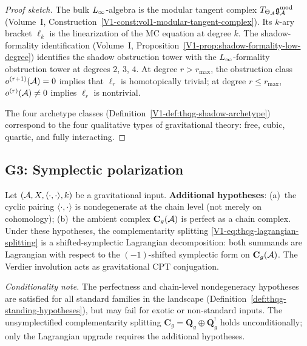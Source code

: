 \begin{proof}[Proof sketch]
The bulk $L_\infty$-algebra is the modular tangent complex
$T_{\Theta_{\mathcal{A}}}\mathfrak{g}_{\mathcal{A}}^{\mathrm{mod}}$ (Volume~I,
Construction~\ref{V1-const:vol1-modular-tangent-complex}). Its
$k$-ary bracket $\ell_k$ is the linearization of the MC equation
at degree $k$. The shadow-formality identification
(Volume~I, Proposition~\ref{V1-prop:shadow-formality-low-degree})
identifies the shadow obstruction tower with the $L_\infty$-formality obstruction
tower at degrees $2$, $3$, $4$. At degree $r > r_{\max}$, the
obstruction class $o^{(r+1)}(\mathcal{A}) = 0$ implies that $\ell_r$ is
homotopically trivial; at degree $r \le r_{\max}$, $o^{(r)}(\mathcal{A}) \ne 0$
implies $\ell_r$ is nontrivial.

The four archetype classes (Definition~\ref{V1-def:thqg-shadow-archetype})
correspond to the four qualitative types of gravitational theory: free,
cubic, quartic, and fully interacting.
\end{proof}


\subsection{G3: Symplectic polarization}

\begin{theorem}
Let $(\mathcal{A}, X, \langle\cdot,\cdot\rangle, k)$ be a gravitational input.
\textbf{Additional hypotheses}: (a)~the cyclic pairing
$\langle\cdot,\cdot\rangle$ is nondegenerate at the chain level
(not merely on cohomology); (b)~the ambient complex $\mathbf{C}_g(\mathcal{A})$
is perfect as a chain complex.
Under these hypotheses, the complementarity splitting
\eqref{V1-eq:thqg-lagrangian-splitting} is a shifted-symplectic Lagrangian
decomposition: both summands are Lagrangian with respect to the
$(-1)$-shifted symplectic form on $\mathbf{C}_g(\mathcal{A})$. The Verdier
involution acts as gravitational CPT conjugation.

\smallskip\noindent
\textit{Conditionality note.}
The perfectness and chain-level nondegeneracy hypotheses are satisfied
for all standard families in the landscape
(Definition~\ref{def:thqg-standing-hypotheses}), but may fail for
exotic or non-standard inputs. The unsymplectified complementarity
splitting $\mathbf{C}_g = \mathbf{Q}_g \oplus \mathbf{Q}_g^!$ holds
unconditionally; only the Lagrangian upgrade requires the additional
hypotheses.
\end{theorem}

